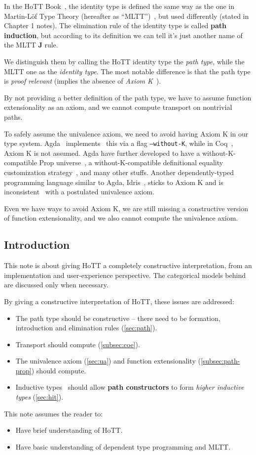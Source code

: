 In the HoTT Book~\cite{hottbook},
the identity type is defined the same way as the one
in Martin-L\"{o}f Type Theory (hereafter as ``MLTT'')~\cite{MLTT},
but used differently (stated in Chapter 1 notes).
The elimination rule of the identity type is called \textbf{path induction},
but according to its definition we can tell
it's just another name of the MLTT \textbf J rule.

We distinguish them by calling the HoTT identity type the \textit{path type},
while the MLTT one as the \textit{identity type}.
The most notable difference is that the path type is
\textit{proof relevant} (implies the absence of
\textit{Axiom K}~\cite{AxiomK}).

By not providing a better definition of the path type,
we have to assume function extensionality as an axiom,
and we cannot compute transport on nontrivial paths.

To safely assume the univalence axiom, we need to avoid having Axiom K
in our type system.
Agda~\cite{Agda} implements~\cite{WithoutK} this via a flag \texttt{--without-K},
while in Coq~\cite{Coq}, Axiom K is not assumed.
Agda have further developed to have a without-K-compatible \textsf{Prop}
universe~\cite{PropWithoutK}, a without-K-compatible definitional equality
customization strategy~\cite{RewriteWithoutK}, and many other stuffs.
Another dependently-typed programming language similar to Agda,
Idris~\cite{Idris}, sticks to Axiom K and is
inconsistent~\cite{IdrisHoTT} with a postulated univalence axiom.

Even we have ways to avoid Axiom K,
we are still missing a constructive version of function extensionality,
and we also cannot compute the univalence axiom.

\subsection{Introduction}
\label{subsec:introduction}

This note is about giving HoTT a completely constructive interpretation,
from an implementation and user-experience perspective.
The categorical models behind are discussed only when necessary.

By giving a constructive interpretation of HoTT,
these issues are addressed:

\begin{itemize}
\item The path type should be constructive --
  there need to be formation, introduction and
  elimination rules (\cref{sec:path}).
\item Transport should compute (\cref{subsec:coe}).
\item The univalence axiom (\cref{sec:ua}) and function extensionality
  (\cref{subsec:path-prop}) should compute.
\item Inductive types~\cite{Inductive} should allow \textbf{path constructors}
  to form \textit{higher inductive types} (\cref{sec:hit}).
\end{itemize}

This note assumes the reader to:

\begin{itemize}
\item Have brief understanding of HoTT.
\item Have basic understanding of dependent type programming and MLTT.
\end{itemize}